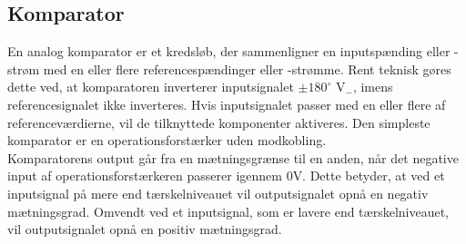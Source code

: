 \subsection{Komparator}\label{Komparatorafsnit}
En analog komparator er et kredsløb, der sammenligner en inputspænding eller -strøm med en eller flere referencespændinger eller -strømme. Rent teknisk gøres dette ved, at komparatoren inverterer inputsignalet $\pm180^{\circ}$ V$_{-}$, imens referencesignalet ikke inverteres. Hvis inputsignalet passer med en eller flere af referenceværdierne, vil de tilknyttede komponenter aktiveres. Den simpleste komparator er en operationsforstærker uden modkobling. \cite{webster2009} \\
Komparatorens output går fra en mætningsgrænse til en anden, når det negative input af operationsforstærkeren passerer igennem $0$V. Dette betyder, at ved et inputsignal på mere end tærskelniveauet vil outputsignalet opnå en negativ mætningsgrad. Omvendt ved et inputsignal, som er lavere end tærskelniveauet, vil outputsignalet opnå en positiv mætningsgrad. \cite{webster2009} 

